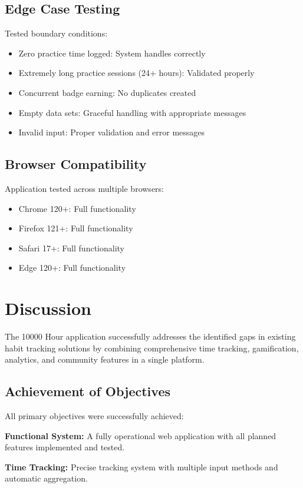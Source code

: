 \documentclass[12pt,a4paper]{report}
\newcommand{\JustifiedNormal}{\fontsize{12}{14}\selectfont\justifying\setlength{\parindent}{0pt}}
\begin{document}
\subsection{Edge Case Testing}
\JustifiedNormal
Tested boundary conditions:
\begin{itemize}
  \item Zero practice time logged: System handles correctly
  \item Extremely long practice sessions (24+ hours): Validated properly
  \item Concurrent badge earning: No duplicates created
  \item Empty data sets: Graceful handling with appropriate messages
  \item Invalid input: Proper validation and error messages
\end{itemize}

\subsection{Browser Compatibility}
\JustifiedNormal
Application tested across multiple browsers:
\begin{itemize}
  \item Chrome 120+: Full functionality
  \item Firefox 121+: Full functionality
  \item Safari 17+: Full functionality
  \item Edge 120+: Full functionality
\end{itemize}

\section{Discussion}
\JustifiedNormal
The 10000 Hour application successfully addresses the identified gaps in existing habit tracking solutions by combining comprehensive time tracking, gamification, analytics, and community features in a single platform.

\subsection{Achievement of Objectives}
\JustifiedNormal
All primary objectives were successfully achieved:

\textbf{Functional System:} A fully operational web application with all planned features implemented and tested.

\textbf{Time Tracking:} Precise tracking system with multiple input methods and automatic aggregation.
\end{document}
